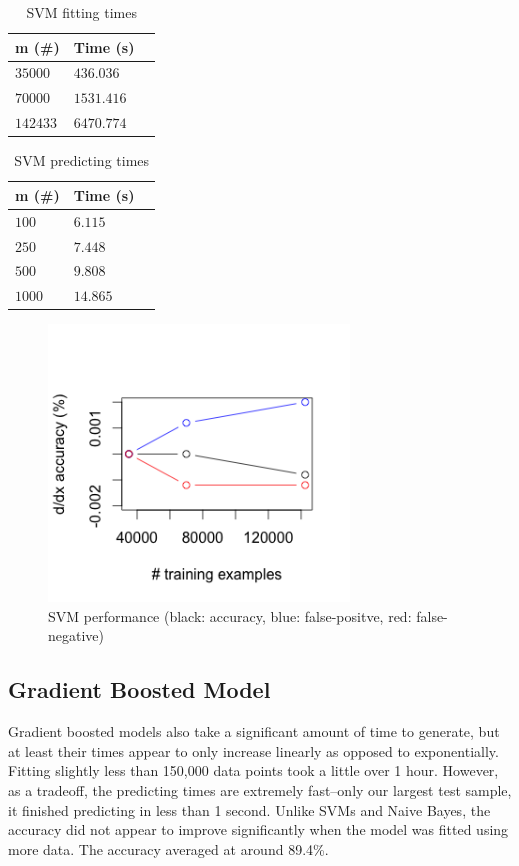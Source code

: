 \documentclass[twoside]{article}
\begin{document}
\begin{multicols}{2}
\begin{table}[H]
\caption{SVM fitting times}
\centering
\begin{tabular}{llr}
\toprule
m (\#) & Time (s) \\
\midrule
$35000$ & $436.036$ \\
$70000$ & $1531.416$ \\
$142433$ & $6470.774$ \\
\bottomrule
\end{tabular}
\end{table}

\begin{table}[H]
\caption{SVM predicting times}
\centering
\begin{tabular}{llr}
\toprule
m (\#) & Time (s) \\
\midrule
$100$ & $6.115$ \\
$250$ & $7.448$ \\
$500$ & $9.808$ \\
$1000$ & $14.865$ \\
\bottomrule
\end{tabular}
\end{table}

\begin{figure}[H]
 \caption{SVM performance (black: accuracy, blue: false-positve, red: false-negative)}
  \centering
    \includegraphics[width=8cm]{../data/svm_acc}
\end{figure}

\subsection{Gradient Boosted Model}
Gradient boosted models also take a significant amount of time to generate, but at least their times appear to only increase linearly as opposed to exponentially. Fitting slightly less than 150,000 data points took a little over 1 hour. However, as a tradeoff, the predicting times are extremely fast--only our largest test sample, it finished predicting in less than 1 second. Unlike SVMs and Naive Bayes, the accuracy did not appear to improve significantly when the model was fitted using more data. The accuracy averaged at around 89.4\%. 


\end{multicols}
\end{document}
